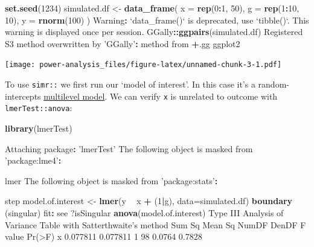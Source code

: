 \documentclass[]{article}
\newenvironment{Shaded}{\begin{snugshade}}{\end{snugshade}}
\newcommand{\DataTypeTok}[1]{\textcolor[rgb]{0.13,0.29,0.53}{#1}}
\newcommand{\DecValTok}[1]{\textcolor[rgb]{0.00,0.00,0.81}{#1}}
\newcommand{\KeywordTok}[1]{\textcolor[rgb]{0.13,0.29,0.53}{\textbf{#1}}}
\newcommand{\NormalTok}[1]{#1}
\newcommand{\OperatorTok}[1]{\textcolor[rgb]{0.81,0.36,0.00}{\textbf{#1}}}
\newcommand{\StringTok}[1]{\textcolor[rgb]{0.31,0.60,0.02}{#1}}
\begin{document}
\begin{Shaded}
\begin{Highlighting}[]
\KeywordTok{set.seed}\NormalTok{(}\DecValTok{1234}\NormalTok{)}
\NormalTok{simulated.df <-}\StringTok{ }\KeywordTok{data_frame}\NormalTok{(}
  \DataTypeTok{x =} \KeywordTok{rep}\NormalTok{(}\DecValTok{0}\OperatorTok{:}\DecValTok{1}\NormalTok{, }\DecValTok{50}\NormalTok{),}
  \DataTypeTok{g =} \KeywordTok{rep}\NormalTok{(}\DecValTok{1}\OperatorTok{:}\DecValTok{10}\NormalTok{, }\DecValTok{10}\NormalTok{),}
  \DataTypeTok{y =} \KeywordTok{rnorm}\NormalTok{(}\DecValTok{100}\NormalTok{)}
\NormalTok{)}
\NormalTok{Warning}\OperatorTok{:}\StringTok{ `}\DataTypeTok{data_frame()}\StringTok{`}\NormalTok{ is deprecated, use }\StringTok{`}\DataTypeTok{tibble()}\StringTok{`}\NormalTok{.}
\NormalTok{This warning is displayed once per session.}
\NormalTok{GGally}\OperatorTok{::}\KeywordTok{ggpairs}\NormalTok{(simulated.df)}
\NormalTok{Registered S3 method overwritten by }\StringTok{'GGally'}\OperatorTok{:}
\StringTok{  }\NormalTok{method from   }
  \OperatorTok{+}\NormalTok{.gg   ggplot2}
\end{Highlighting}
\end{Shaded}

\texttt{[image: power-analysis\_files/figure-latex/unnamed-chunk-3-1.pdf]}

To use \texttt{simr::} we first run our `model of interest'. In this case it's a
random-intercepts \protect\hyperlink{multilevel-models}{multilevel model}. We can verify \texttt{x} is
unrelated to outcome with \texttt{lmerTest::anova}:

\begin{Shaded}
\begin{Highlighting}[]
\KeywordTok{library}\NormalTok{(lmerTest)}

\NormalTok{Attaching package}\OperatorTok{:}\StringTok{ 'lmerTest'}
\NormalTok{The following object is masked from }\StringTok{'package:lme4'}\OperatorTok{:}

\StringTok{    }\NormalTok{lmer}
\NormalTok{The following object is masked from }\StringTok{'package:stats'}\OperatorTok{:}

\StringTok{    }\NormalTok{step}
\NormalTok{model.of.interest <-}\StringTok{ }\KeywordTok{lmer}\NormalTok{(y }\OperatorTok{~}\StringTok{ }\NormalTok{x }\OperatorTok{+}\StringTok{ }\NormalTok{(}\DecValTok{1}\OperatorTok{|}\NormalTok{g), }\DataTypeTok{data=}\NormalTok{simulated.df)}
\KeywordTok{boundary}\NormalTok{ (singular) fit}\OperatorTok{:}\StringTok{ }\NormalTok{see ?isSingular}
\KeywordTok{anova}\NormalTok{(model.of.interest)}
\NormalTok{Type III Analysis of Variance Table with Satterthwaite}\StringTok{'s method}
\StringTok{    Sum Sq  Mean Sq NumDF DenDF F value Pr(>F)}
\StringTok{x 0.077811 0.077811     1    98  0.0764 0.7828}
\end{Highlighting}
\end{Shaded}
\end{document}

